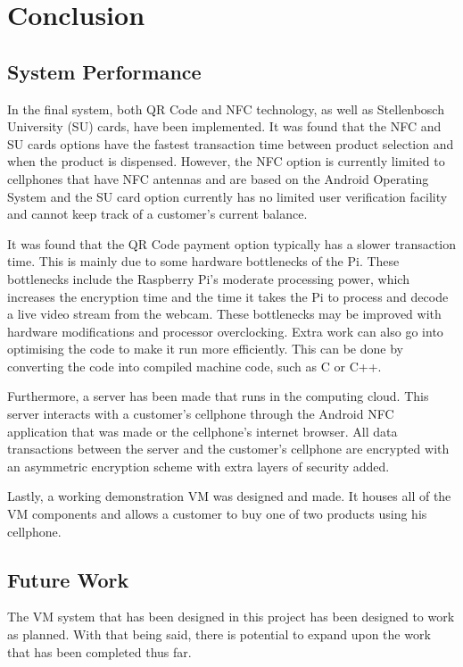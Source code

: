 \chapter{Conclusion}
\label{chap:7}

\section{System Performance}

In the final system, both QR Code and NFC technology, as well as Stellenbosch University
(SU) cards, have been implemented. It was found that the NFC and SU cards options have the
fastest transaction time between product selection and when the product is dispensed.
However, the NFC option is currently limited to cellphones that have NFC antennas and are
based on the Android Operating System and the SU card option currently has no limited
user verification facility and cannot keep track of a customer's current balance.

It was found that the QR Code payment option typically has a slower transaction time. This
is mainly due to some hardware bottlenecks of the Pi. These bottlenecks include the
Raspberry Pi's moderate processing power, which increases the encryption time and the
time it takes the Pi to process and decode a live video stream from the webcam. These
bottlenecks may be improved with hardware modifications and processor overclocking. Extra
work can also go into optimising the code to make it run more efficiently. This can be
done by converting the code into compiled machine code, such as C or C++.

Furthermore, a server has been made that runs in the computing cloud. This server
interacts with a customer's cellphone through the Android NFC application that was made
or the cellphone's internet browser. All data transactions between the server and the
customer's cellphone are encrypted with an asymmetric encryption scheme with extra layers
of security added.

Lastly, a working demonstration VM was designed and made. It houses all of
the VM components and allows a customer to buy one of two products using
his cellphone. 

\section{Future Work}

The VM system that has been designed in this project has been designed to
work as planned. With that being said, there is potential to expand upon the work that has
been completed thus far.

